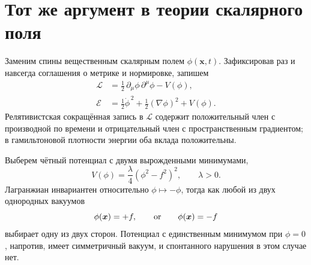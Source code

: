 \begin{classroomqa}
\end{classroomqa}

\begin{classroomqa}
\end{classroomqa}

\section{Тот же аргумент в теории скалярного поля}

Заменим спины вещественным скалярным полем \(\phi(\bm{x},t)\). Зафиксировав раз и навсегда соглашения о метрике и нормировке, запишем
\begin{equation}
\begin{aligned}
  \mathcal L
  &=\frac12\,\partial_\mu\phi\,\partial^\mu\phi-V(\phi),
  \\
  \mathcal E
  &=\frac12\dot\phi^{\,2}+\frac12(\nabla\phi)^2+V(\phi).
\end{aligned}
  \label{eq:l07-real-scalar}
\end{equation}
Релятивистская сокращённая запись в \(\mathcal L\) содержит положительный член с производной по времени и отрицательный член с пространственным градиентом; в гамильтоновой плотности энергии оба вклада положительны.

Выберем чётный потенциал с двумя вырожденными минимумами,
\begin{equation}
  V(\phi)=\frac{\lambda}{4}\left(\phi^2-f^2\right)^2,
  \qquad \lambda>0.
  \label{eq:l07-double-well}
\end{equation}
Лагранжиан инвариантен относительно \(\phi\mapsto-\phi\), тогда как любой из двух однородных вакуумов
\begin{equation}
  \phi(\bm{x})=+f,
  \qquad\hbox{or}\qquad
  \phi(\bm{x})=-f
\end{equation}
выбирает одну из двух сторон. Потенциал с единственным минимумом при \(\phi=0\), напротив, имеет симметричный вакуум, и спонтанного нарушения в этом случае нет.

